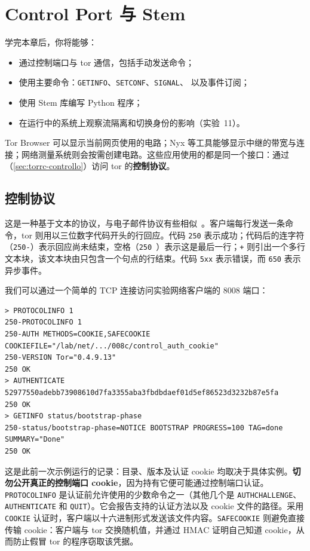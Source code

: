 \chapter{Control Port 与 Stem}\label{cap:18-stem}

\begin{obiettivi}
学完本章后，你将能够：
\begin{itemize}[nosep]
  \item 通过控制端口与 tor 通信，包括手动发送命令；
  \item 使用主要命令：\texttt{GETINFO}、\texttt{SETCONF}、\texttt{SIGNAL}、 以及事件订阅；
  \item 使用 Stem 库编写 Python 程序；
  \item 在运行中的系统上观察流隔离和切换身份的影响（实验~11）。
\end{itemize}
\end{obiettivi}

Tor Browser 可以显示当前网页使用的电路；Nyx 等工具能够显示中继的带宽与连接；网络测量系统则会按需创建电路。这些应用使用的都是同一个接口：通过 （\cref{sec:torrc-controllo}）访问 tor 的\textbf{控制协议}。

\section{控制协议}\label{sec:stem-protocollo}

这是一种基于文本的协议，与电子邮件协议有些相似~。客户端每行发送一条命令，tor 则用以三位数字代码开头的行回应。代码 \texttt{250} 表示成功；代码后的连字符（\texttt{250-}）表示回应尚未结束，空格（\texttt{250 }）表示这是最后一行；\texttt{+} 则引出一个多行文本块，该文本块由只包含一个句点的行结束。代码 \texttt{5xx} 表示错误，而 \texttt{650} 表示异步事件。

我们可以通过一个简单的 TCP 连接访问实验网络客户端的 8008 端口：
\begin{lstlisting}[numbers=none]
> PROTOCOLINFO 1
250-PROTOCOLINFO 1
250-AUTH METHODS=COOKIE,SAFECOOKIE COOKIEFILE="/lab/net/.../008c/control_auth_cookie"
250-VERSION Tor="0.4.9.13"
250 OK
> AUTHENTICATE 52977550adebb73908610d7fa3355aba3fbdbdaef01d5ef86523d3232b87e5fa
250 OK
> GETINFO status/bootstrap-phase
250-status/bootstrap-phase=NOTICE BOOTSTRAP PROGRESS=100 TAG=done SUMMARY="Done"
250 OK
\end{lstlisting}
这是此前一次示例运行的记录：目录、版本及认证 cookie 均取决于具体实例。\textbf{切勿公开真正的控制端口 cookie}，因为持有它便可能通过控制端口认证。
\texttt{PROTOCOLINFO} 是认证前允许使用的少数命令之一（其他几个是 \texttt{AUTHCHALLENGE}、\texttt{AUTHENTICATE} 和 \texttt{QUIT}）。它会报告支持的认证方法以及 cookie 文件的路径。采用 \texttt{COOKIE} 认证时，客户端以十六进制形式发送该文件内容。\texttt{SAFECOOKIE} 则避免直接传输 cookie：客户端与 tor 交换随机值，并通过 HMAC 证明自己知道 cookie，从而防止假冒 tor 的程序窃取该凭据。

